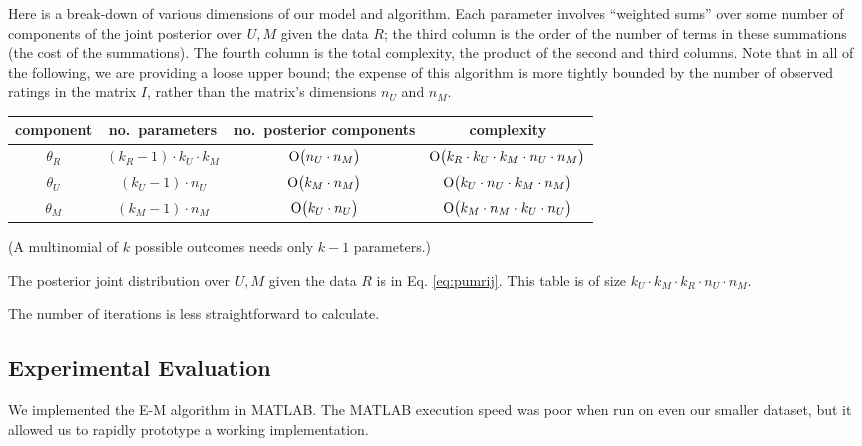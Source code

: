 \documentclass{article}
\begin{document}
Here is a break-down of various dimensions of our model and
algorithm. Each parameter involves ``weighted sums'' over some number
of components of the joint posterior over $U,M$ given the data $R$;
the third column is the order of the number of terms in these
summations (the cost of the summations). The fourth column is the
total complexity, the product of the second and third columns. Note
that in all of the following, we are providing a loose upper bound;
the expense of this algorithm is more tightly bounded by the number of
observed ratings in the matrix $I$, rather than the matrix's
dimensions $n_U$ and $n_M$.
\begin{center}
  \begin{tabular}{c|c|c|c}
    component & no.~parameters &
    no.~posterior components & complexity
    \\ \hline
    $\theta_R$ & $(k_R - 1) \cdot k_U \cdot k_M$ &
    $\operatorname{O}\bigl(n_U \cdot n_M\bigr)$ &
    $\operatorname{O}\bigl(k_R \cdot k_U \cdot k_M \cdot n_U \cdot n_M\bigr)$ \\
    $\theta_U$ & $(k_U - 1) \cdot n_U$ &
    $\operatorname{O}\bigl(k_M \cdot n_M\bigr)$ & $\operatorname{O}\bigl(k_U \cdot n_U \cdot k_M \cdot n_M\bigr)$ \\
    $\theta_M$ & $(k_M - 1) \cdot n_M$ &
    $\operatorname{O}\bigl(k_U \cdot n_U\bigr)$ & $\operatorname{O}\bigl(k_M \cdot n_M \cdot k_U \cdot n_U\bigr)$ \\
  \end{tabular}
\end{center}
(A multinomial of $k$ possible outcomes needs only $k-1$ parameters.)

The posterior joint distribution over $U,M$ given the data $R$ is in
Eq. \ref{eq:pumrij}. This table is of size $k_U \cdot k_M \cdot k_R
\cdot n_U \cdot n_M$.

 The number of iterations is less
straightforward to calculate.

\subsection{Experimental Evaluation}

We implemented the E-M algorithm in MATLAB. The MATLAB execution speed
was poor when run on even our smaller dataset, but it allowed us to
rapidly prototype a working implementation.
\end{document}
